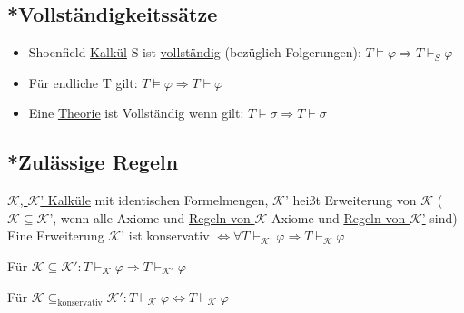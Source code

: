 \documentclass[12pt,a4paper]{article} %
\begin{document}
	\subsection{*Vollständigkeitssätze}
	\label{TheorieVollstandig}
	\begin{itemize}
		\item Shoenfield-\hyperref[Kalkul]{Kalkül} S ist \hyperref[ALVollstandig]{vollständig} (bezüglich Folgerungen): $T \hyperref[Erfullbar]{\vDash} \varphi \Rightarrow T \hyperref[Beweisbar]{\vdash_S} \varphi$
		\item Für endliche T gilt: $T \hyperref[Erfullbar]{\vDash} \varphi \Rightarrow T \hyperref[Beweisbar]{\vdash} \varphi$
		\item Eine \hyperref[Theorie]{Theorie} ist Vollständig wenn gilt: $T \hyperref[Erfullbar]{\vDash} \sigma \Rightarrow T \hyperref[Beweisbar]{\vdash} \sigma$
	\end{itemize}
	
	\subsection{*Zulässige Regeln}
	\label{Zulassig}
	\hyperref[Kalkul]{$\mathcal{K}$, $\mathcal{K}$' Kalküle} mit identischen Formelmengen, $\mathcal{K}$' heißt Erweiterung von $\mathcal{K}$ ($\mathcal{K} \subseteq \mathcal{K}$', wenn alle Axiome und \hyperref[Kalkul]{Regeln von $\mathcal{K}$} Axiome und \hyperref[Kalkul]{Regeln von $\mathcal{K}$'} sind) \newline
	Eine Erweiterung $\mathcal{K}$' ist konservativ $\Leftrightarrow \forall T \hyperref[Beweisbar]{\vdash_{\mathcal{K}'}} \varphi \Rightarrow T \hyperref[Beweisbar]{\vdash_{\mathcal{K}}} \varphi$
	
	Für $\mathcal{K} \subseteq \mathcal{K}': T \hyperref[Beweisbar]{\vdash_{\mathcal{K}}} \varphi \Rightarrow T \hyperref[Beweisbar]{\vdash_{\mathcal{K}'}} \varphi$
	
	Für $\mathcal{K} \subseteq_{\text{konservativ}} \mathcal{K}': T \hyperref[Beweisbar]{\vdash_{\mathcal{K}}} \varphi \Leftrightarrow T \hyperref[Beweisbar]{\vdash_{\mathcal{K}}} \varphi$
\end{document}
